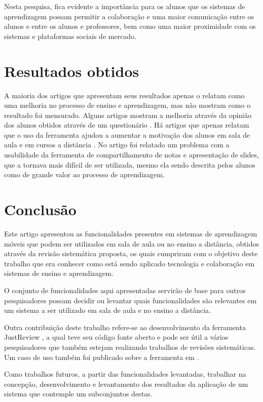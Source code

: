 Nesta pesquisa, fica evidente a importância para os alunos que os sistemas de aprendizagem possam permitir a colaboração e uma maior comunicação entre os alunos e entre os alunos e professores, bem como uma maior proximidade com os sistemas e plataformas sociais de mercado.

\section{Resultados obtidos}

A maioria dos artigos que apresentam seus resultados apenas o relatam como uma melhoria no processo de ensino e aprendizagem, mas não mostram como o resultado foi mensurado. Alguns artigos mostram a melhoria através da opinião dos alunos obtidos através de um questionário \cite{rawat_work_2008}. Há artigos que apenas relatam que o uso da ferramenta ajudou a aumentar a motivação dos alunos em sala de aula e em cursos a distância \cite{tokiwa_web-based_2009}.
No artigo \cite{singh_collaborative_2004} foi relatado um problema com a usabilidade da ferramenta de compartilhamento de notas e apresentação de slides, que a tornava mais difícil de ser utilizada, mesmo ela sendo descrita pelos alunos como de grande valor ao processo de aprendizagem.

\section{Conclusão}
Este artigo apresentou as funcionalidades presentes em sistemas de aprendizagem móveis que podem ser utilizados em sala de aula ou no ensino a distância, obtidos através da revisão sistemática proposta, os quais cumpriram com o objetivo deste trabalho que era conhecer como está sendo aplicado tecnologia e colaboração em sistemas de ensino e aprendizagem.

O conjunto de funcionalidades aqui apresentadas servirão de base para outros pesquisadores possam decidir ou levantar quais funcionalidades são relevantes em um sistema a ser utilizado em sala de aula e no ensino a distância.

Outra contribuição deste trabalho refere-se ao desenvolvimento da ferramenta JustReview \cite{justreview}, a qual teve seu código fonte aberto e pode ser útil a vários pesquisadores que também estejam realizando trabalhos de revisões sistemáticas. Um caso de uso também foi publicado sobre a ferramenta em \cite{justreview_artigo}.

Como trabalhos futuros, a partir das funcionalidades levantadas, trabalhar na concepção, desenvolvimento e levantamento dos resultados da aplicação de um sistema que contemple um subconjuntos destas.